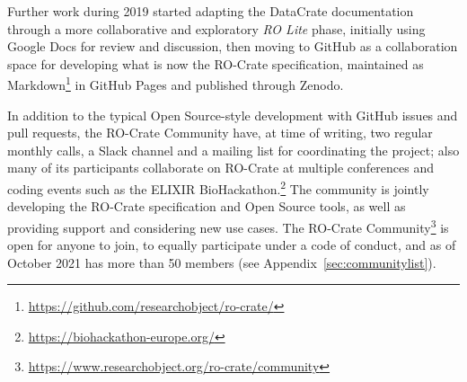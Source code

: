 \documentclass[ds,v1.1.2,openaccess]{iosart2x}%
\begin{document}
Further work during 2019 started adapting the DataCrate documentation
through a more collaborative and exploratory \textit{RO Lite} phase, initially
using Google Docs for review and discussion, then moving to GitHub as a
collaboration space for developing what is now the RO-Crate
specification, maintained as
Markdown\footnote{\url{https://github.com/researchobject/ro-crate/}} in GitHub Pages
and published through Zenodo.

In addition to the typical Open Source-style development with GitHub
issues and pull requests, the RO-Crate Community have, at time of
writing, two regular monthly calls, a Slack channel and a mailing list
for coordinating the project; also many of its participants collaborate
on RO-Crate at multiple conferences and coding events such as the
ELIXIR BioHackathon.\footnote{\url{https://biohackathon-europe.org/}} The community
is jointly developing the RO-Crate specification and Open Source tools,
as well as providing support and considering new use cases. The
RO-Crate Community\footnote{\url{https://www.researchobject.org/ro-crate/community}}
is open for anyone to join, to equally participate under a code of
conduct, and as of October 2021 has more than 50 members (see Appendix~\ref{sec:communitylist}).
\end{document}
